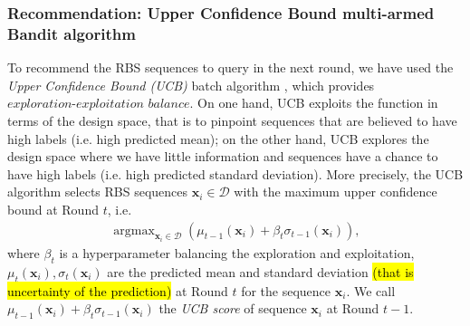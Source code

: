\documentclass{scrartcl}[2013/05/29]%
\begin{document}

\subsubsection{Recommendation: Upper Confidence Bound multi-armed Bandit algorithm}

To recommend the RBS sequences to query in the next round, we have used the \textit{Upper Confidence Bound (UCB)} batch algorithm
\cite{lattimore2020bandit}
, which provides  $\textit{exploration-exploitation balance}$.
On one hand, UCB exploits the function in terms of the design space, that is to pinpoint sequences that are believed to have high labels (i.e. high predicted mean); 
on the other hand, UCB explores the design space where we have little information and sequences have a chance to have high labels (i.e. high predicted standard deviation).
More precisely, the UCB algorithm selects RBS sequences $\mathbf{x}_i \in \mathcal{D}$ with the maximum upper confidence bound at Round $t$, i.e.
\begin{align}
\label{Eq: GPUCB}
    \operatorname{argmax}_{\mathbf{x}_i \in \mathcal{D}} \left( \mu_{t-1}(\mathbf{x}_i) + \beta_t \sigma_{t-1}(\mathbf{x}_i)\right),
\end{align}
where $\beta_t$ is a hyperparameter balancing the exploration and exploitation, 
$\mu_t(\mathbf{x}_i), \sigma_t(\mathbf{x}_i)$ are the predicted mean and standard deviation \hl{(that is uncertainty of the prediction)} at Round $t$ for the sequence $\mathbf{x}_i$.
We call $\mu_{t-1}(\mathbf{x}_i) + \beta_t \sigma_{t-1}(\mathbf{x}_i)$ the \textit{UCB score} of sequence $\mathbf{x}_i$ at Round $t-1$.\\
\end{document}
